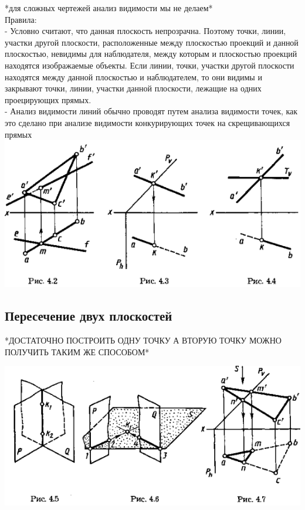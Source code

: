 \documentclass[a4paper, 12pt]{article}
\begin{document}
*для сложных чертежей анализ видимости мы не делаем*\\

Правила:\\
- Условно считают, что данная плоскость непрозрачна. Поэтому точки, линии, участки другой плоскости, расположенные между плоскостью проекций и данной плоскостью, невидимы для наблюдателя, между которым и плоскостью проекций находятся изображаемые объекты. Если линии, точки, участки другой плоскости находятся между данной плоскостью и наблюдателем, то они видимы и закрывают точки, линии, участки данной плоскости, лежащие на одних проецирующих прямых.\\

- Анализ видимости линий обычно проводят путем анализа видимости точек, как это сделано при анализе видимости конкурирующих точек на скрещивающихся прямых\\

\includegraphics{img/412.png}\\


\subsection{Пересечение двух плоскостей}

*ДОСТАТОЧНО ПОСТРОИТЬ ОДНУ ТОЧКУ А ВТОРУЮ ТОЧКУ МОЖНО ПОЛУЧИТЬ ТАКИМ ЖЕ СПОСОБОМ*

\includegraphics{img/421.png}\\
\end{document}
